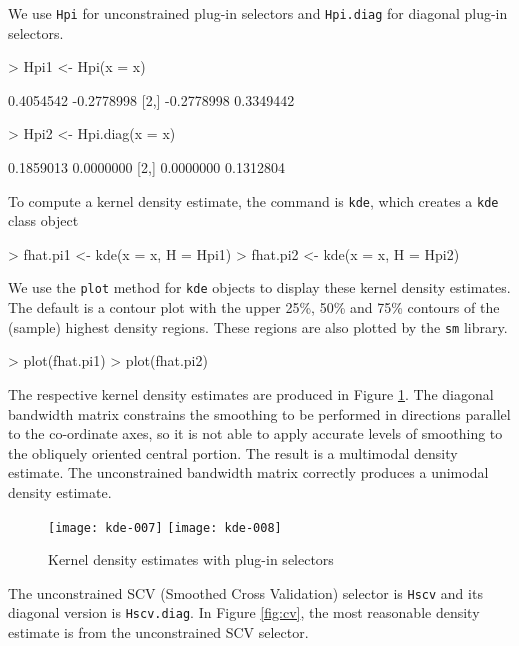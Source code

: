 \documentclass[a4paper,11pt]{article}
\let\code=\texttt
\let\pkg=\texttt
\begin{document}
We use \code{Hpi} for 
unconstrained plug-in selectors and \code{Hpi.diag} for diagonal plug-in selectors.
\begin{Schunk}
\begin{Sinput}
> Hpi1 <- Hpi(x = x)
\end{Sinput}
\begin{Soutput}
           [,1]       [,2]
[1,]  0.4054542 -0.2778998
[2,] -0.2778998  0.3349442
\end{Soutput}
\begin{Sinput}
> Hpi2 <- Hpi.diag(x = x)
\end{Sinput}
\begin{Soutput}
          [,1]      [,2]
[1,] 0.1859013 0.0000000
[2,] 0.0000000 0.1312804
\end{Soutput}
\end{Schunk}
To compute a kernel density estimate, the 
command is \code{kde}, which creates a \code{kde} class object
\begin{Schunk}
\begin{Sinput}
> fhat.pi1 <- kde(x = x, H = Hpi1)
> fhat.pi2 <- kde(x = x, H = Hpi2)
\end{Sinput}
\end{Schunk}
We use the \code{plot} method for \code{kde} objects to display these
kernel density estimates. The default is a contour plot with 
the upper 25\%, 50\% and 75\% contours of the 
(sample) highest density regions. %
These regions are also plotted by the \pkg{sm} library.
\begin{Schunk}
\begin{Sinput}
> plot(fhat.pi1)
> plot(fhat.pi2)
\end{Sinput}
\end{Schunk}
The respective kernel density estimates are produced in Figure \ref{fig:pi}.
The diagonal bandwidth matrix constrains the smoothing to be performed in directions
parallel to the co-ordinate axes, so it is not able to apply accurate levels
of smoothing to the obliquely oriented central portion. The result is a 
multimodal
density estimate. The unconstrained bandwidth matrix correctly produces 
a unimodal density estimate. 


\begin{figure}[!ht]
\centering
\texttt{[image: kde-007]}
\texttt{[image: kde-008]}
\caption{Kernel density estimates with plug-in selectors}
\label{fig:pi}
\end{figure}


The unconstrained SCV (Smoothed Cross Validation) selector is \code{Hscv} and 
its diagonal version is \code{Hscv.diag}.
In Figure \ref{fig:cv}, the most
reasonable density estimate is from the unconstrained SCV selector. 
 
\end{document}

